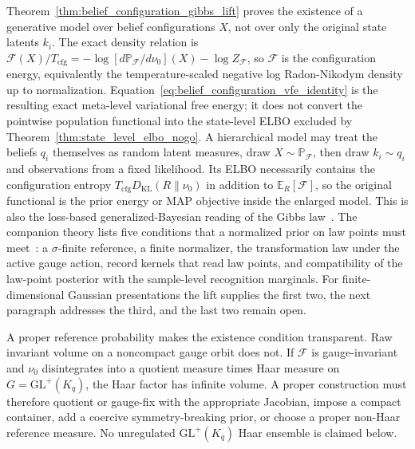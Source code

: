 \begin{remark}
\label{rem:gibbs_lift_interpretation}
Theorem~\ref{thm:belief_configuration_gibbs_lift} proves the existence of a generative model over belief configurations $X$, not over only the original state latents $k_i$. The exact density relation is $\mathcal{F}(X)/T_{\mathrm{cfg}}=-\log[d\mathbb{P}_{\mathcal{F}}/d\nu_0](X)-\log Z_{\mathcal{F}}$, so $\mathcal{F}$ is the configuration energy, equivalently the temperature-scaled negative log Radon-Nikodym density up to normalization. Equation~\eqref{eq:belief_configuration_vfe_identity} is the resulting exact meta-level variational free energy; it does not convert the pointwise population functional into the state-level ELBO excluded by Theorem~\ref{thm:state_level_elbo_nogo}. A hierarchical model may treat the beliefs $q_i$ themselves as random latent measures, draw $X\sim\mathbb{P}_{\mathcal{F}}$, then draw $k_i\sim q_i$ and observations from a fixed likelihood. Its ELBO necessarily contains the configuration entropy $T_{\mathrm{cfg}}D_{\mathrm{KL}}(R\|\nu_0)$ in addition to $\mathbb{E}_R[\mathcal{F}]$, so the original functional is the prior energy or MAP objective inside the enlarged model. This is also the loss-based generalized-Bayesian reading of the Gibbs law~\cite{BissiriHolmesWalker2016}. The companion theory lists five conditions that a normalized prior on law points must meet~\cite[Ch.~3]{DennisGaugeVFE2026}: a $\sigma$-finite reference, a finite normalizer, the transformation law under the active gauge action, record kernels that read law points, and compatibility of the law-point posterior with the sample-level recognition marginals. For finite-dimensional Gaussian presentations the lift supplies the first two, the next paragraph addresses the third, and the last two remain open.

A proper reference probability makes the existence condition transparent. Raw invariant volume on a noncompact gauge orbit does not. If $\mathcal{F}$ is gauge-invariant and $\nu_0$ disintegrates into a quotient measure times Haar measure on $G=\mathrm{GL}^+(K_q)$, the Haar factor has infinite volume. A proper construction must therefore quotient or gauge-fix with the appropriate Jacobian, impose a compact container, add a coercive symmetry-breaking prior, or choose a proper non-Haar reference measure. No unregulated $\mathrm{GL}^+(K_q)$ Haar ensemble is claimed below.
\end{remark}

